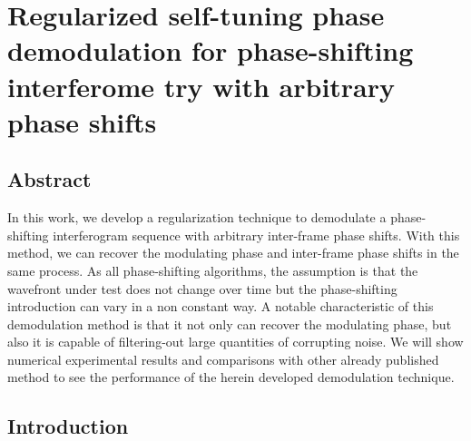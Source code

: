 \chapter{Regularized self-tuning phase demodulation for phase-shifting
interferome try with arbitrary phase shifts}

\section{Abstract}
In this work, we develop a regularization technique to demodulate
a phase-shifting interferogram sequence with arbitrary inter-frame
phase shifts. With this method, we can recover the modulating phase
and inter-frame phase shifts in the same process. As all phase-shifting
algorithms, the assumption is that the wavefront under test does not
change over time but the phase-shifting introduction can vary in a
non constant way. A notable characteristic of this demodulation method
is that it not only can recover the modulating phase, but also it
is capable of filtering-out large quantities of corrupting noise.
We will show numerical experimental results and comparisons with other
already published method to see the performance of the herein developed
demodulation technique.

\section{Introduction}

